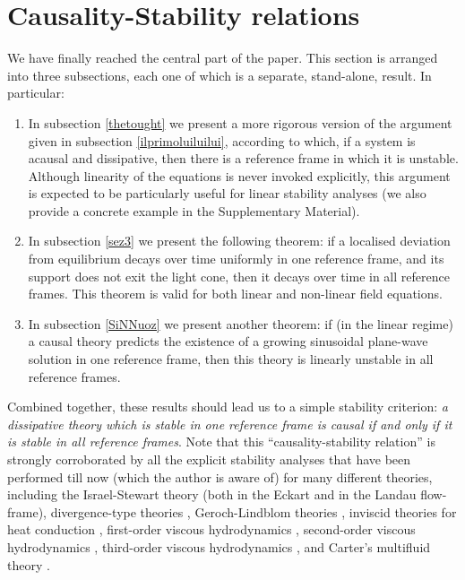 \documentclass[a4paper, amsfonts, amssymb, amsmath, reprint, showkeys,  twoside, onecolumn,notitlepage,nofootinbib]{revtex4-1}
\theoremstyle{definition}
\theoremstyle{theorem}
\begin{document}
%
%
%







\section{Causality-Stability relations}\label{causalstablerelazione}

We have finally reached the central part of the paper. This section is arranged into three subsections, each one of which is a separate, stand-alone, result. In particular:
\begin{enumerate}
\item In subsection \ref{thetought} we present a more rigorous version of the argument given in subsection \ref{ilprimoluiluilui}, according to which, if a system is acausal and dissipative, then there is a reference frame in which it is unstable. Although linearity of the equations is never invoked explicitly, this argument is expected to be particularly useful for linear stability analyses (we also provide a concrete example in the Supplementary Material).
\item In subsection \ref{sez3} we present the following theorem: if a localised deviation from equilibrium decays over time uniformly in one reference frame, and its support does not exit the light cone, then it decays over time in all reference frames. This theorem is valid for both linear and non-linear field equations.
\item In subsection \ref{SiNNuoz} we present another theorem: if (in the linear regime) a causal theory predicts the existence of a growing sinusoidal plane-wave solution in one reference frame, then this theory is linearly unstable in all reference frames.
\end{enumerate} 
Combined together, these results should lead us to a simple stability criterion: \textit{a dissipative theory which is stable in one reference frame is causal if and only if it is stable in all reference frames}. Note that this ``causality-stability relation'' is strongly corroborated by all the explicit stability analyses that have been performed till now (which the author is aware of) for many different theories, including the Israel-Stewart theory (both in the Eckart \cite{Hishcock1983} and in the Landau \cite{OlsonLifsh1990} flow-frame), divergence-type theories \cite{GerochLindblom1990}, Geroch-Lindblom theories \cite{Geroch_Lindblom_1991_causal}, inviscid theories for heat conduction \cite{OlsonRegularCarter1990}, first-order viscous hydrodynamics \cite{Kovtun2019,BemficaDNDefinitivo2020}, second-order viscous hydrodynamics \cite{Pu2010}, third-order viscous hydrodynamics \cite{BrutoThird2021}, and Carter's multifluid theory \cite{GavassinoStabilityCarter2022}.
\end{document}
